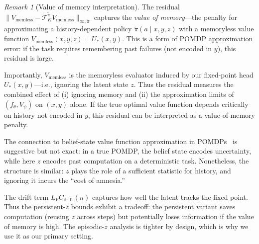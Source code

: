 \documentclass{article}
\theoremstyle{plain}
\theoremstyle{definition}
\theoremstyle{remark}
\newtheorem{remark}[theorem]{Remark}
\newcommand{\Cdrift}{C_{\mathrm{drift}}}
\begin{document}
{\begin{remark}[Value of memory interpretation]
\label{rem:value_of_memory}
The residual $\|V_{\mathrm{memless}} - \mathcal{T}_K^{\tilde{\pi}} V_{\mathrm{memless}}\|_{\infty,\tilde{\pi}}$ captures the \emph{value of memory}---the penalty for approximating a history-dependent policy $\tilde{\pi}(a\mid x,y,z)$ with a memoryless value function $V_{\mathrm{memless}}(x,y,z) = U_*(x,y)$.
This is a form of POMDP approximation error: if the task requires remembering past failures (not encoded in $y$), this residual is large.

Importantly, $V_{\mathrm{memless}}$ is the memoryless evaluator induced by our fixed-point head $U_*(x,y)$---i.e., ignoring the latent state $z$.
Thus the residual measures the combined effect of (i) ignoring memory and (ii) the approximation limits of $(f_\theta, V_\psi)$ on $(x,y)$ alone.
If the true optimal value function depends critically on history not encoded in $y$, this residual can be interpreted as a value-of-memory penalty.

The connection to belief-state value function approximation in POMDPs~\citep{Kaelbling1998POMDP} is suggestive but not exact: in a true POMDP, the belief state encodes uncertainty, while here $z$ encodes past computation on a deterministic task.
Nonetheless, the structure is similar: $z$ plays the role of a sufficient statistic for history, and ignoring it incurs the ``cost of amnesia.''

The drift term $L_V \Cdrift(n)$ captures how well the latent tracks the fixed point.
Thus the persistent-$z$ bounds exhibit a tradeoff: the persistent variant saves computation (reusing $z$ across steps) but potentially loses information if the value of memory is high.
The episodic-$z$ analysis is tighter by design, which is why we use it as our primary setting.
\end{remark}}
\end{document}
